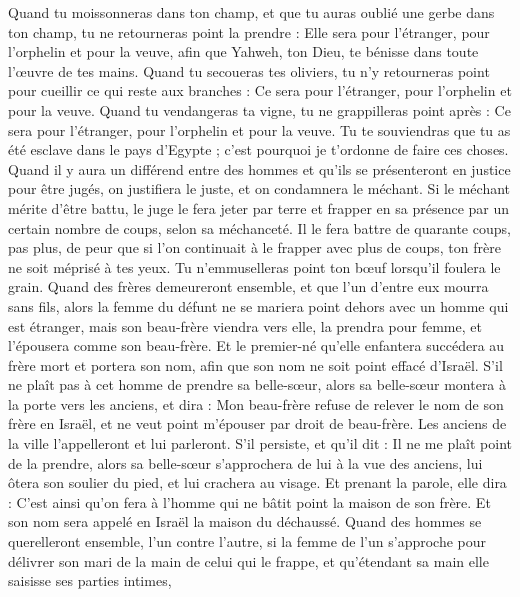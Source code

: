 \begin{multicols}{2}
Quand tu moissonneras dans ton champ, et que tu auras oublié une gerbe dans ton champ, tu ne retourneras point la prendre : Elle sera pour l'étranger, pour l'orphelin et pour la veuve, afin que Yahweh, ton Dieu, te bénisse dans toute l’œuvre de tes mains.
Quand tu secoueras tes oliviers, tu n'y retourneras point pour cueillir ce qui reste aux branches : Ce sera pour l'étranger, pour l'orphelin et pour la veuve.
Quand tu vendangeras ta vigne, tu ne grappilleras point après : Ce sera pour l'étranger, pour l'orphelin et pour la veuve.
Tu te souviendras que tu as été esclave dans le pays d'Egypte ; c'est pourquoi je t’ordonne de faire ces choses.
\VerseOne{}Quand il y aura un différend entre des hommes et qu'ils se présenteront en justice pour être jugés, on justifiera le juste, et on condamnera le méchant.
Si le méchant mérite d'être battu, le juge le fera jeter par terre et frapper en sa présence par un certain nombre de coups, selon sa méchanceté.
Il le fera battre de quarante coups, pas plus, de peur que si l’on continuait à le frapper avec plus de coups, ton frère ne soit méprisé à tes yeux.
Tu n'emmuselleras point ton bœuf lorsqu'il foulera le grain.
Quand des frères demeureront ensemble, et que l'un d'entre eux mourra sans fils, alors la femme du défunt ne se mariera point dehors avec un homme qui est étranger, mais son beau-frère viendra vers elle, la prendra pour femme, et l'épousera comme son beau-frère.
Et le premier-né qu'elle enfantera succédera au frère mort et portera son nom, afin que son nom ne soit point effacé d'Israël.
S'il ne plaît pas à cet homme de prendre sa belle-sœur, alors sa belle-sœur montera à la porte vers les anciens, et dira : Mon beau-frère refuse de relever le nom de son frère en Israël, et ne veut point m'épouser par droit de beau-frère.
Les anciens de la ville l'appelleront et lui parleront. S'il persiste, et qu'il dit : Il ne me plaît point de la prendre,
alors sa belle-sœur s'approchera de lui à la vue des anciens, lui ôtera son soulier du pied, et lui crachera au visage. Et prenant la parole, elle dira : C'est ainsi qu'on fera à l'homme qui ne bâtit point la maison de son frère.
Et son nom sera appelé en Israël la maison du déchaussé.
Quand des hommes se querelleront ensemble, l'un contre l'autre, si la femme de l'un s'approche pour délivrer son mari de la main de celui qui le frappe, et qu'étendant sa main elle saisisse ses parties intimes,

\end{multicols}
